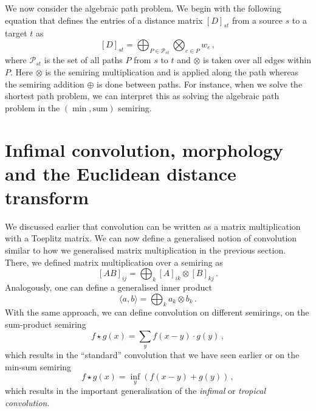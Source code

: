 We now consider the algebraic path problem. We begin with the
following equation that defines the entries of a distance matrix
${[D]}_{st}$ from a source $s$ to a target $t$ as
\begin{equation*}
  {[D]}_{st} = \bigoplus_{P \in \mathcal{P}_{st}} \bigotimes_{e \in P} w_e\,,
\end{equation*}
where $\mathcal{P}_{st}$ is the set of all paths $P$ from $s$ to $t$
and $\otimes$ is taken over all edges within $P$. Here $\otimes$ is
the semiring multiplication and is applied along the path whereas the
semiring addition $\oplus$ is done between paths. For instance, when
we solve the shortest path problem, we can interpret this as solving
the algebraic path problem in the $(\min, \text{sum})$ semiring.

\section{Infimal convolution, morphology and the Euclidean distance
  transform}
We discussed earlier that convolution can be written as a matrix
multiplication with a Toeplitz matrix. We can now define a generalised
notion of convolution similar to how we generalised matrix
multiplication in the previous section. There, we defined matrix
multiplication over a semiring as
\begin{equation*}
  {[AB]}_{ij} = \bigoplus_k {[A]}_{ik} \otimes {[B]}_{kj}\,.
\end{equation*}
Analogously, one can define a generalised inner product
\begin{equation*}
  \langle a,b \rangle = \bigoplus_k a_k \otimes b_k\,.
\end{equation*}
With the same approach, we can define convolution on different
semirings, \eg on the sum-product semiring
\begin{equation*}
  f \star g(x) = \sum_y f(x-y) \cdot g(y)\,,
\end{equation*}
which results in the ``standard'' convolution that we have seen
earlier or on the min-sum semiring
\begin{equation*}
  f \star g(x) = \inf_y\left( f(x-y) + g(y)\right)\,,
\end{equation*}
which results in the important generalisation of the \emph{infimal} or
\emph{tropical convolution}.



